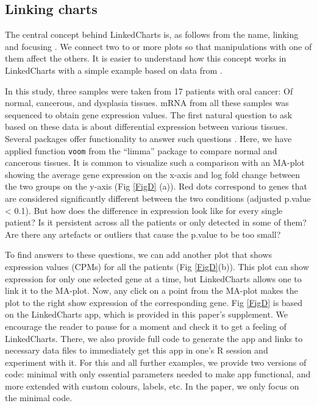 \documentclass[twocolumn,10pt]{article}
\begin{document}
\subsection{Linking charts}

The central concept behind LinkedCharts is, as follows from the name, linking and focusing \citep{buja_1991}. We connect two to or more plots so that manipulations with one of them affect the others. It is easier to understand how this concept works in LinkedCharts with a simple example based on data from \citet{conway_2015}.

In this study, three samples were taken from 17 patients with oral cancer: Of normal, cancerous, and dysplasia tissues. mRNA from all these samples was sequenced to obtain gene expression values. The first natural question to ask based on these data is about differential expression between various tissues. Several packages offer functionality to answer such questions  \citep{ritchie_2015, love_2014}. Here, we have applied function \texttt{voom} from the ``limma'' package to compare normal and cancerous tissues. It is common to visualize such a comparison with an MA-plot \citep{dudoit_2002} showing the average gene expression on the x-axis and log fold change between the two groups on the y-axis (Fig \ref{FigD} (a)). Red dots correspond to genes that are considered significantly different between the two conditions (adjusted p.value < 0.1). But how does the difference in expression look like for every single patient? Is it persistent across all the patients or only detected in some of them? Are there any artefacts or outliers that cause the p.value to be too small?

To find answers to these questions, we can add another plot that shows expression values (CPMs) for all the patients (Fig \ref{FigD}(b)). This plot can show expression for only one selected gene at a time, but LinkedCharts allows one to link it to the MA-plot. Now, any click on a point from the MA-plot makes the plot to the right show expression of the corresponding gene. Fig \ref{FigD} is based on the LinkedCharts app, which is provided in this paper's supplement. We encourage the reader to pause for a moment and check it to get a feeling of LinkedCharts. There, we also provide full code to generate the app and links to necessary data files to immediately get this app in one's R session and experiment with it. For this and all further examples, we provide two versions of code: minimal with only essential parameters needed to make app functional, and more extended with custom colours, labels, etc. In the paper, we only focus on the minimal code.
\end{document}
